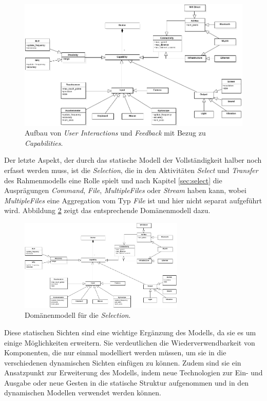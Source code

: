 \begin{figure}[h]
\centering
\includegraphics[page=3, width=\textwidth]{bilder/domain_model.pdf}
\caption{Aufbau von \textit{User Interactions} und \textit{Feedback} mit Bezug zu \textit{Capabilities}.}
\label{fig:dm_input_output}
\end{figure}

Der letzte Aspekt, der durch das statische Modell der Vollständigkeit halber noch erfasst werden muss, ist die \textit{Selection}, die in den Aktivitäten \textit{Select} und \textit{Transfer} des Rahmenmodells eine Rolle spielt und nach Kapitel \ref{sec:select} die Ausprägungen \textit{Command}, \textit{File}, \textit{MultipleFiles} oder \textit{Stream} haben kann, wobei \textit{MultipleFiles} eine Aggregation vom Typ \textit{File} ist und hier nicht separat aufgeführt wird. Abbildung \ref{fig:dm_selection} zeigt das entsprechende Domänenmodell dazu.

\begin{figure}[h]
\centering
\includegraphics[page=4, width=0.7\textwidth]{bilder/domain_model.pdf}
\caption{Domänenmodell für die \textit{Selection}.}
\label{fig:dm_selection}
\end{figure}

Diese statischen Sichten sind eine wichtige Ergänzung des Modells, da sie es um einige Möglichkeiten erweitern. Sie verdeutlichen die Wiederverwendbarkeit von Komponenten, die nur einmal modelliert werden müssen, um sie in die verschiedenen dynamischen Sichten einfügen zu können. Zudem sind sie ein Ansatzpunkt zur Erweiterung des Modells, indem \zb neue Technologien zur Ein- und Ausgabe oder neue Gesten in die statische Struktur aufgenommen und in den dynamischen Modellen verwendet werden können. 

